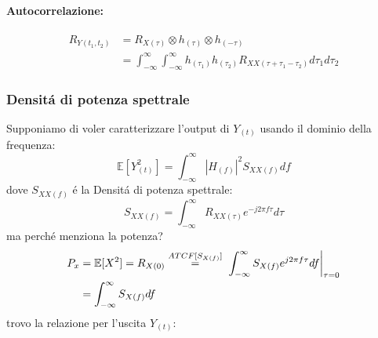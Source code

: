             \paragraph{Autocorrelazione:}
                \begin{align}
                    R_{Y(t_1,t_2)} &= R_{X(\tau)}\otimes h_{(\tau)} \otimes h_{(-\tau)} \nonumber \\
                                    &= \int_{-\infty}^{\infty}\int_{-\infty}^{\infty} h_{(\tau_1)}h_{(\tau_2)} R_{XX(\tau+\tau_1-\tau_2)} d\tau_1d\tau_2\nonumber
                \end{align}    
        \subsubsection{Densitá di potenza spettrale}
            Supponiamo di voler caratterizzare l'output di $Y_{(t)}$ usando il dominio della frequenza:
            \[
                \mathbb{E}[Y_{(t)}^2] = \int_{-\infty}^{\infty} \left|H_{(f)}\right|^2 S_{XX(f)} df  
            \]
            dove $S_{XX(f)}$ é la Densitá di potenza spettrale:
            \[
                S_{XX(f)} = \int_{-\infty}^{\infty} R_{XX(\tau)} e^{-j2\pi f\tau}d\tau
            \]
            ma perché menziona la potenza?
            \begin{align}
                P_x &= \mathbb{E}[X^2] = R_{X(0)} \overset{ATCF[S_{X(f)}]}{=} \eval*{\int_{-\infty}^{\infty} S_{X(f)} e^{j2\pi f\tau}df}_{\tau=0} \nonumber \\
                    &=  \int_{-\infty}^{\infty} S_{X(f)}df \nonumber
            \end{align}
            trovo la relazione per l'uscita $Y_{(t)}$:
            \begin{figure}[H]
                \centering
            \end{figure}            
